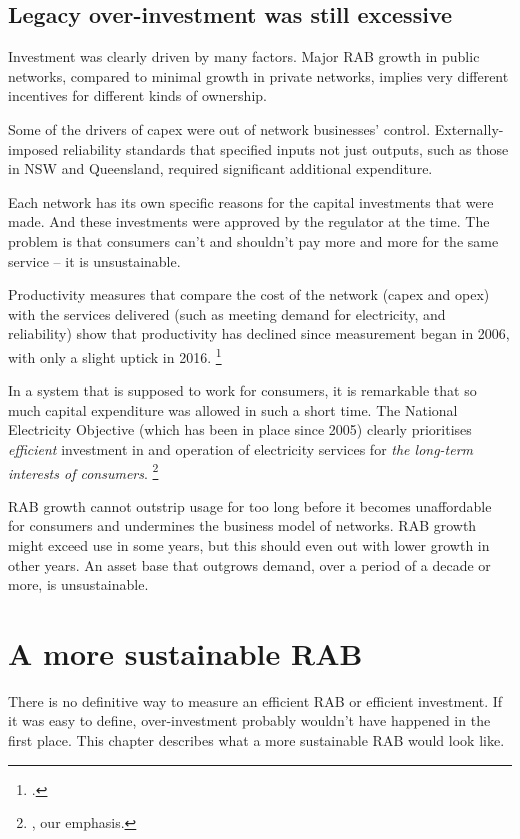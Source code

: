 \documentclass[FrontPage]{grattan}
\begin{document}
\section{Legacy over-investment was still excessive}\label{sec:growth-still-excessive}
Investment was clearly driven by many factors. Major RAB growth in public networks, compared to minimal growth in private networks, implies very different incentives for different kinds of ownership. 

Some of the drivers of capex were out of network businesses' control. Externally-imposed reliability standards that specified inputs not just outputs, such as those in NSW and Queensland, required significant additional expenditure.

Each network has its own specific reasons for the capital investments that were made. And these investments were approved by the regulator at the time. The problem is that consumers can't and shouldn't pay more and more for the same service -- it is unsustainable.

Productivity measures that compare the cost of the network (capex and opex) with the services delivered (such as meeting demand for electricity, and reliability) show that productivity has declined since measurement began in 2006, with only a slight uptick in 2016.%
\footcite{AER2017BenchmarkingReport}

In a system that is supposed to work for consumers, it is remarkable that so much capital expenditure was allowed in such a short time. The National Electricity Objective (which has been in place since 2005) clearly prioritises \emph{efficient} investment in and operation of electricity services for \emph{the long-term interests of consumers}.%
\footnote{\textcite{AEMC2018NationalElectricityObjective}, our emphasis.}

RAB growth cannot outstrip usage for too long before it becomes unaffordable for consumers and undermines the business model of networks. RAB growth might exceed use in some years, but this should even out with lower growth in other years. An asset base that outgrows demand, over a period of a decade or more, is unsustainable.



\chapter{A more sustainable RAB}\label{chap:a-more-sustainable-RAB}

There is no definitive way to measure an efficient RAB or efficient investment. If it was easy to define, over-investment probably wouldn't have happened in the first place. This chapter describes what a more sustainable RAB would look like.
\end{document}

